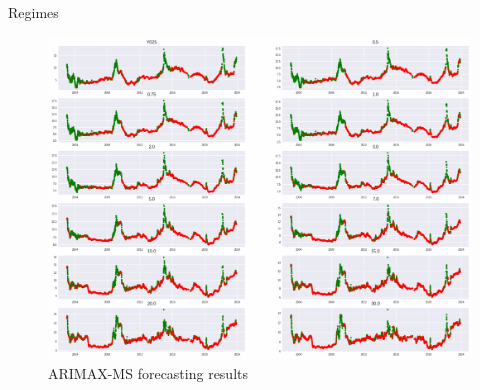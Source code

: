 \documentclass[aspectratio=169]{beamer}
\begin{document}
    \begin{frame}{Regimes}
        \begin{figure}
            \includegraphics[scale=0.3]{fig/MSres.png}
            \caption{ARIMAX-MS forecasting results}
            \label{fig:VARnsfcst}
        \end{figure}
    \end{frame}
\end{document}
